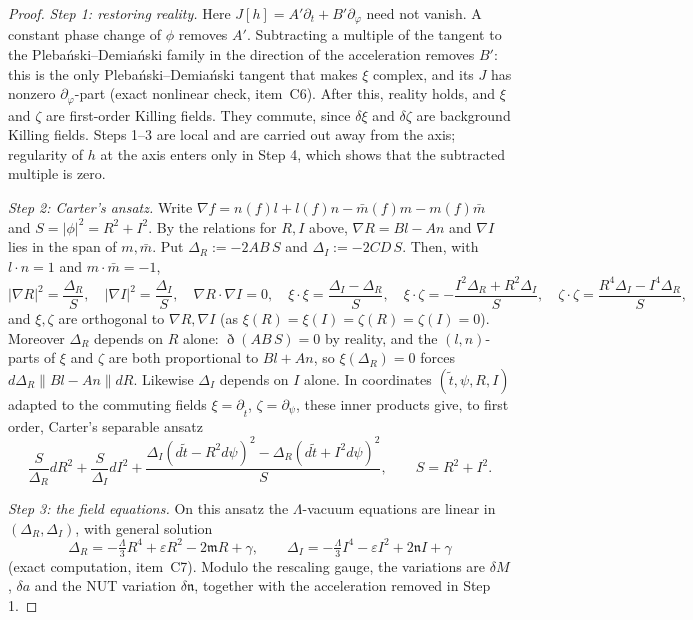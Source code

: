 \documentclass[11pt]{amsart}
\theoremstyle{definition}
\theoremstyle{remark}
\numberwithin{equation}{section}
\begin{document}
\begin{proof}
\emph{Step 1: restoring reality.} Here $J[h]=A'\partial_t+B'\partial_\varphi$ need not vanish. A constant phase change of
$\phi$ removes $A'$. Subtracting a multiple of the tangent to the Pleba\'nski--Demia\'nski family in the direction of
the acceleration removes $B'$: this is the only Pleba\'nski--Demia\'nski tangent that makes $\xi$ complex, and its
$J$ has nonzero $\partial_\varphi$-part (exact nonlinear check, item~C6). After this, reality holds, and $\xi$ and
$\zeta$ are first-order Killing fields. They commute, since $\delta\xi$ and $\delta\zeta$ are background Killing
fields. Steps 1--3 are local and are carried out away from the axis; regularity of $h$ at the axis enters only in
Step 4, which shows that the subtracted multiple is zero.

\emph{Step 2: Carter's ansatz.} Write $\nabla f=n(f)l+l(f)n-\bar m(f)m-m(f)\bar m$ and $S=|\phi|^2=R^2+I^2$. By the
relations for $R,I$ above, $\nabla R=Bl-An$ and $\nabla I$ lies in the span of $m,\bar m$. Put $\Delta_R:=-2AB\,S$ and
$\Delta_I:=-2CD\,S$. Then, with $l\cdot n=1$ and $m\cdot\bar m=-1$,
\[
|\nabla R|^2=\frac{\Delta_R}{S},\quad|\nabla I|^2=\frac{\Delta_I}{S},\quad\nabla R\cdot\nabla I=0,\quad
\xi\cdot\xi=\frac{\Delta_I-\Delta_R}{S},\quad\xi\cdot\zeta=-\frac{I^2\Delta_R+R^2\Delta_I}{S},\quad
\zeta\cdot\zeta=\frac{R^4\Delta_I-I^4\Delta_R}{S},
\]
and $\xi,\zeta$ are orthogonal to $\nabla R,\nabla I$ (as $\xi(R)=\xi(I)=\zeta(R)=\zeta(I)=0$). Moreover $\Delta_R$ depends on
$R$ alone: $\eth(AB\,S)=0$ by reality, and the $(l,n)$-parts of $\xi$ and $\zeta$ are both proportional to $Bl+An$, so
$\xi(\Delta_R)=0$ forces $d\Delta_R\parallel Bl-An\parallel dR$. Likewise $\Delta_I$ depends on $I$ alone. In coordinates
$(\tilde t,\psi,R,I)$ adapted to the commuting fields $\xi=\partial_{\tilde t}$, $\zeta=\partial_\psi$, these inner products give,
to first order, Carter's separable ansatz
\[
\frac{S}{\Delta_R}dR^2+\frac{S}{\Delta_I}dI^2+\frac{\Delta_I(d\tilde t-R^2d\psi)^2-\Delta_R(d\tilde t+I^2d\psi)^2}{S},\qquad S=R^2+I^2.
\]

\emph{Step 3: the field equations.} On this ansatz the $\Lambda$-vacuum equations are linear in $(\Delta_R,\Delta_I)$,
with general solution
\[
\Delta_R=-\tfrac\Lambda3R^4+\varepsilon R^2-2\mathfrak mR+\gamma,\qquad \Delta_I=-\tfrac\Lambda3I^4-\varepsilon I^2+2\mathfrak nI+\gamma
\]
(exact computation, item~C7). Modulo the rescaling gauge, the variations are $\delta M$, $\delta a$ and the NUT
variation $\delta\mathfrak n$, together with the acceleration removed in Step 1.


\end{proof}
\end{document}
